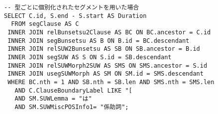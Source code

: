 \documentclass[japanese]{jnlp_1.4}
\begin{document}
\begin{screen}\small
\renewcommand\baselinestretch{0.8}
\begin{verbatim}
-- 型ごとに個別化されたセグメントを用いた場合
SELECT C.id, S.end - S.start AS Duration
  FROM segClause AS C
 INNER JOIN relBunsetsu2Clause AS BC ON BC.ancestor = C.id
 INNER JOIN segBunsetsu AS B ON B.id = BC.descendant
 INNER JOIN relSUW2Bunsetsu AS SB ON SB.ancestor = B.id
 INNER JOIN segSUW AS S ON S.id = SB.descendant
 INNER JOIN relSUWMorph2SUW AS SMS ON SMS.ancestor = S.id
 INNER JOIN usegSUWMorph AS SM ON SM.id = SMS.descendant
 WHERE BC.nth = 1 AND SB.nth = SB.len AND SMS.nth = SMS.len
   AND C.ClauseBoundaryLabel LIKE "[
   AND SM.SUWLemma = "は"
   AND SM.SUWMiscPOSInfo1= "係助詞";
\end{verbatim}
\end{screen}

\begin{biography}
\end{biography}

\biodate
\end{document}

